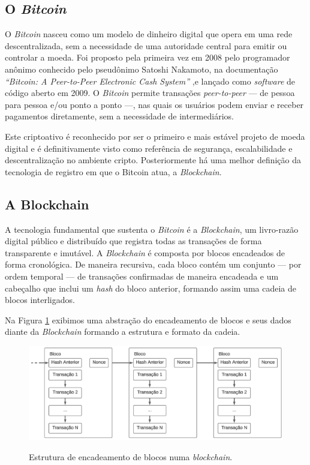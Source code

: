 \documentclass[article,12pt,oneside,a4paper,english,brazil]{unifil}
\begin{document}
\begin{Spacing}{1.5}
\subsection*{O \textit{Bitcoin}} \label{sec:bitcoin}

O \textit{Bitcoin} nasceu como um modelo de dinheiro digital que opera em uma rede descentralizada, sem a necessidade de uma autoridade central para emitir ou controlar a moeda. Foi proposto pela primeira vez em 2008 pelo programador anônimo conhecido pelo pseudônimo Satoshi Nakamoto, na documentação \textit{``Bitcoin: A Peer-to-Peer Electronic Cash System''} \cite{Nakamoto2009} ,e lançado como \textit{software} de código aberto em 2009. O \textit{Bitcoin} permite transações \textit{peer-to-peer} — de pessoa para pessoa e/ou ponto a ponto —, nas quais os usuários podem enviar e receber pagamentos diretamente, sem a necessidade de intermediários.

Este criptoativo é reconhecido por ser o primeiro e mais estável projeto de moeda digital e é definitivamente visto como referência de segurança, escalabilidade e descentralização no ambiente cripto. Posteriormente há uma melhor definição da tecnologia de registro em que o Bitcoin atua, a \textit{Blockchain}.

\subsection*{A Blockchain} \label{subsec:blockchain}

A tecnologia fundamental que sustenta o \textit{Bitcoin} é a \textit{Blockchain}, um livro-razão digital público e distribuído que registra todas as transações de forma transparente e imutável. A \textit{Blockchain} é composta por blocos encadeados de forma cronológica. De maneira recursiva, cada bloco contém um conjunto — por ordem temporal — de transações confirmadas de maneira encadeada e um cabeçalho que inclui um \textit{hash} do bloco anterior, formando assim uma cadeia de blocos interligados.

Na Figura \ref*{fig:blockchain} exibimos uma abstração do encadeamento de blocos e seus dados diante da \textit{Blockchain} formando a estrutura e formato da cadeia.

\begin{figure}[h]
	\centering
	\caption{Estrutura de encadeamento de blocos numa \textit{blockchain}.}
	\includegraphics[width=.8\linewidth]{../images/figura 2.png}
	\label{fig:blockchain}
\end{figure}


\end{Spacing}
\end{document}
